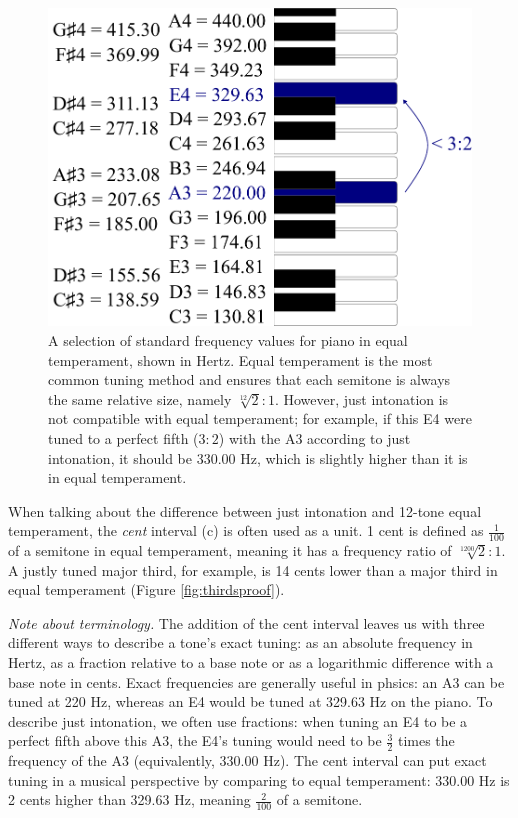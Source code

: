 \documentclass[a4paper]{article}
\begin{document}
\begin{figure}
	\centering
	\includegraphics[width=0.65\linewidth]{Figures/12TET.pdf}
	\caption{A selection of standard frequency values for piano in equal temperament, shown in Hertz. Equal temperament is the most common tuning method and ensures that each semitone is always the same relative size, namely $\sqrt[12]{2}:1$. However, just intonation is not compatible with equal temperament; for example, if this E4 were tuned to a perfect fifth ($3:2$) with the A3 according to just intonation, it should be $330.00$ Hz, which is slightly higher than it is in equal temperament.}
	\label{fig:12TET}
\end{figure}

When talking about the difference between just intonation and 12-tone equal temperament, the \textit{cent} interval (c) is often used as a unit. 1 cent is defined as $\frac{1}{100}$ of a semitone in equal temperament, meaning it has a frequency ratio of $\sqrt[1200]{2}:1$. A justly tuned major third, for example, is 14 cents lower than a major third in equal temperament (Figure \ref{fig:thirdsproof}).

\textit{Note about terminology.} The addition of the cent interval leaves us with three different ways to describe a tone's exact tuning: as an absolute frequency in Hertz, as a fraction relative to a base note or as a logarithmic difference with a base note in cents. Exact frequencies are generally useful in phsics: an A3 can be tuned at 220 Hz, whereas an E4 would be tuned at 329.63 Hz on the piano. To describe just intonation, we often use fractions: when tuning an E4 to be a perfect fifth above this A3, the E4's tuning would need to be $\frac32$ times the frequency of the A3 (equivalently, 330.00 Hz). The cent interval can put exact tuning in a musical perspective by comparing to equal temperament: 330.00 Hz is 2 cents higher than 329.63 Hz, meaning $\frac{2}{100}$ of a semitone.
\end{document}
